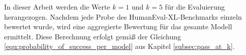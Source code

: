 In dieser Arbeit werden die Werte $k=1$ und $k=5$ für die Evaluierung herangezogen. Nachdem jede Probe des HumanEval-XL-Benchmarks einzeln bewertet wurde, wird eine aggregierte Bewertung für das gesamte Modell ermittelt. Diese Berechnung erfolgt gemäß der Gleichung \ref{equ:probability_of_success_per_model} aus Kapitel \ref{subsec:pass_at_k}.\vspace{0.2cm}

